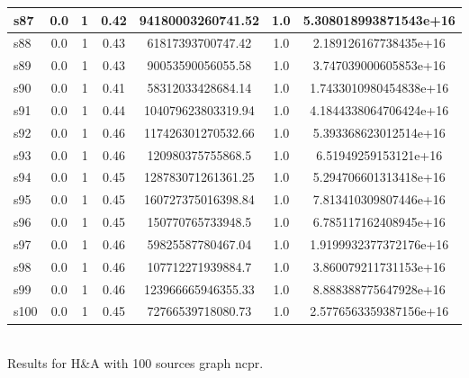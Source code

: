 \documentclass{article}
\begin{document}
\begin{tabular}{|l|c|c|c|c|c|c|}
\hline
s87 &0.0 & 1 & 0.42 & 94180003260741.52 & 1.0 & 5.308018993871543e+16\\
\hline
s88 &0.0 & 1 & 0.43 & 61817393700747.42 & 1.0 & 2.189126167738435e+16\\
\hline
s89 &0.0 & 1 & 0.43 & 90053590056055.58 & 1.0 & 3.747039000605853e+16\\
\hline
s90 &0.0 & 1 & 0.41 & 58312033428684.14 & 1.0 & 1.7433010980454838e+16\\
\hline
s91 &0.0 & 1 & 0.44 & 104079623803319.94 & 1.0 & 4.1844338064706424e+16\\
\hline
s92 &0.0 & 1 & 0.46 & 117426301270532.66 & 1.0 & 5.393368623012514e+16\\
\hline
s93 &0.0 & 1 & 0.46 & 120980375755868.5 & 1.0 & 6.51949259153121e+16\\
\hline
s94 &0.0 & 1 & 0.45 & 128783071261361.25 & 1.0 & 5.294706601313418e+16\\
\hline
s95 &0.0 & 1 & 0.45 & 160727375016398.84 & 1.0 & 7.813410309807446e+16\\
\hline
s96 &0.0 & 1 & 0.45 & 150770765733948.5 & 1.0 & 6.785117162408945e+16\\
\hline
s97 &0.0 & 1 & 0.46 & 59825587780467.04 & 1.0 & 1.9199932377372176e+16\\
\hline
s98 &0.0 & 1 & 0.46 & 107712271939884.7 & 1.0 & 3.860079211731153e+16\\
\hline
s99 &0.0 & 1 & 0.46 & 123966665946355.33 & 1.0 & 8.888388775647928e+16\\
\hline
s100 &0.0 & 1 & 0.45 & 72766539718080.73 & 1.0 & 2.5776563359387156e+16\\
\hline
\end{tabular}\\

\noindent Results for H\&A with 100 sources graph ncpr.
\end{document}
